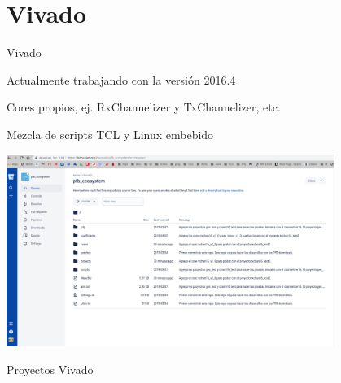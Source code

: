 \documentclass[ignorenonframetext,12pt]{beamer}
\begin{document}
\section{Vivado}
\begin{frame}{Vivado}

				Actualmente trabajando con la versi\'on 2016.4

				Cores propios, ej. RxChannelizer y TxChannelizer, etc.

				Mezcla de scripts TCL y Linux embebido
				\begin{center}
								\includegraphics[width=0.8\textwidth]{pfb_repo}
				\end{center}
\end{frame}

\begin{frame}{Proyectos Vivado}
				\begin{center}
				\end{center}
\end{frame}
\end{document}
